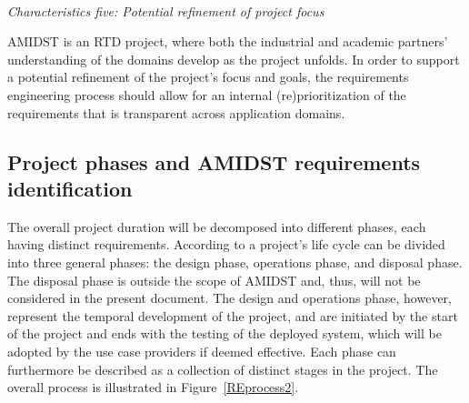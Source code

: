 
\ \\
\noindent \emph{Characteristics five: Potential refinement of project focus}
\label{sec:characteristic5}

AMIDST is an RTD project, where both the industrial and academic partners' understanding of the domains develop as
the project unfolds. In order to support a potential refinement of the project's focus and goals, the requirements
engineering process should allow for an internal (re)prioritization of the requirements that is transparent across
application domains.    





\subsection{Project phases and AMIDST requirements identification }


The overall project duration will be decomposed into different phases, each having distinct requirements. According to
\cite{Eig09} a project's life cycle can be divided into three general phases: the design phase, operations phase, and
disposal phase. The disposal phase is outside the scope of AMIDST and, thus, will not be considered in the present
document. The design and operations phase, however, represent the
temporal development of the project, and are initiated by the start of the project and ends with the testing of the
deployed system, which will be adopted by the use case providers if deemed effective. Each
phase can furthermore be described as a collection of distinct stages in the project. The overall process is
illustrated in Figure~\ref{REprocess2}. 


